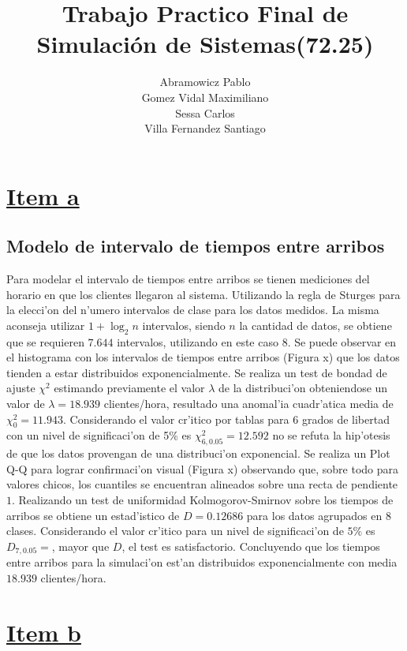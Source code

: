 \documentclass[a4paper,10pt]{article}
\title{Trabajo Practico Final de Simulaci\'on de Sistemas(72.25)}
\author{
Abramowicz Pablo\\
Gomez Vidal Maximiliano\\
Sessa Carlos\\
Villa Fernandez Santiago\\
}
\begin{document}
\maketitle

\section*{\underline{Item a}}
\subsection{Modelo de intervalo de tiempos entre arribos}
Para modelar el intervalo de tiempos entre arribos se tienen mediciones del horario en que los clientes llegaron al sistema. Utilizando la regla de Sturges para la elecci'on del n'umero intervalos de clase para los datos medidos. La misma aconseja utilizar $1 + \log_2 n$ intervalos, siendo $n$ la cantidad de datos, se obtiene que se requieren $7.644$ intervalos, utilizando en este caso $8$. Se puede observar en el histograma con los intervalos de tiempos entre arribos (Figura x) que los datos tienden a estar distribuidos exponencialmente. Se realiza un test de bondad de ajuste $\chi^2$ estimando previamente el valor $\lambda$ de la distribuci'on obteniendose un valor de $\lambda = 18.939$ clientes/hora, resultado una anomal'ia cuadr'atica media de $\chi_0^2 = 11.943$. Considerando el valor cr'itico por tablas para $6$ grados de libertad con un nivel de significaci'on de 5\% es $\chi_{6,0.05}^2 = 12.592$ no se refuta la hip'otesis de que los datos provengan de una distribuci'on exponencial. Se realiza un Plot Q-Q para lograr confirmaci'on visual (Figura x) observando que, sobre todo para valores chicos, los cuantiles se encuentran alineados sobre una recta de pendiente $1$. Realizando un test de uniformidad Kolmogorov-Smirnov sobre los tiempos de arribos se obtiene un estad'istico de $D =  0.12686$ para los datos agrupados en $8$ clases. Considerando el valor cr'itico para un nivel de significaci'on de $5\%$ es $D_{7, 0.05} = $, mayor que $D$, el test es satisfactorio. Concluyendo que los tiempos entre arribos para la simulaci'on est'an distribuidos exponencialmente con media $18.939$ clientes/hora.

\section*{\underline{Item b}}
\end{document}
